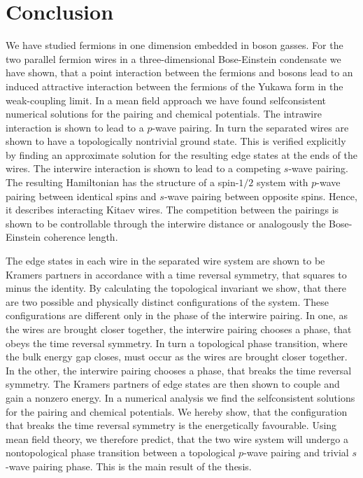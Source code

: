 \chapter{Conclusion} 
\label{Chapter10} 

We have studied fermions in one dimension embedded in boson gasses. For the two parallel fermion wires in a three-dimensional Bose-Einstein condensate we have shown, that a point interaction between the fermions and bosons lead to an induced attractive interaction between the fermions of the Yukawa form in the weak-coupling limit. In a mean field approach we have found selfconsistent numerical solutions for the pairing and chemical potentials. The intrawire interaction is shown to lead to a $p$-wave pairing. In turn the separated wires are shown to have a topologically nontrivial ground state. This is verified explicitly by finding an approximate solution for the resulting edge states at the ends of the wires. The interwire interaction is shown to lead to a competing $s$-wave pairing. The resulting Hamiltonian has the structure of a spin-$1/2$ system with $p$-wave pairing between identical spins and $s$-wave pairing between opposite spins. Hence, it describes interacting Kitaev wires. The competition between the pairings is shown to be controllable through the interwire distance or analogously the Bose-Einstein coherence length. 

The edge states in each wire in the separated wire system are shown to be Kramers partners in accordance with a time reversal symmetry, that squares to minus the identity. By calculating the topological invariant we show, that there are two possible and physically distinct configurations of the system. These configurations are different only in the phase of the interwire pairing. In one, as the wires are brought closer together, the interwire pairing chooses a phase, that obeys the time reversal symmetry. In turn a topological phase transition, where the bulk energy gap closes, must occur as the wires are brought closer together. In the other, the interwire pairing chooses a phase, that breaks the time reversal symmetry. The Kramers partners of edge states are then shown to couple and gain a nonzero energy. In a numerical analysis we find the selfconsistent solutions for the pairing and chemical potentials. We hereby show, that the configuration that breaks the time reversal symmetry is the energetically favourable. Using mean field theory, we therefore predict, that the two wire system will undergo a nontopological phase transition between a topological $p$-wave pairing and trivial $s$-wave pairing phase. This is the main result of the thesis. 

